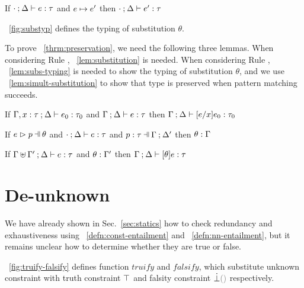 \documentclass[runningheads,envcountsame,a4paper]{llncs}
\begin{document}
\begin{theorem}[Preservation]
  \label{thrm:preservation}
  If $\cdot \mathbin{;} \Delta \vdash e : \tau$ and $e \mapsto e'$
  then $\cdot \mathbin{;} \Delta \vdash e' : \tau$
\end{theorem}



\figurename~\ref{fig:substyp} defines the typing of substitution $\theta$.

To prove \theoremname~\ref{thrm:preservation}, we need the following three lemmas.
When considering Rule \ITAp, \lemmaname~\ref{lem:substitution} is needed.
When considering Rule \ITSuccMatch, \lemmaname~\ref{lem:subs-typing} is needed
to show the typing of substitution $\theta$, and we use
\lemmaname~\ref{lem:simult-substitution} to show that type is preserved when pattern
matching succeeds.

\begin{lemma}[Substitution]
  \label{lem:substitution}
  If $\Gamma, x : \tau \mathbin{;} \Delta \vdash e_0 : \tau_0$ and $\Gamma \mathbin{;} \Delta \vdash e : \tau$
  then $\Gamma \mathbin{;} \Delta \vdash [e/x]e_0 : \tau_0$
\end{lemma}

\begin{lemma}
  \label{lem:subs-typing}
  If $\hpatmatch{e}{p}{\theta}$ and $\cdot \mathbin{;} \Delta \vdash e : \tau$ and $\hpattyp{p}{\tau}{\Gamma}{\Delta'}$
  then $\theta : \Gamma$
\end{lemma}

\begin{lemma}
  \label{lem:simult-substitution}
  If $\Gamma \uplus \Gamma' \mathbin{;} \Delta \vdash e : \tau$ and $\theta : \Gamma'$
  then $\Gamma \mathbin{;} \Delta \vdash [\theta]e : \tau$
\end{lemma}

\section{De-unknown}\label{sec:algorithm}

We have already shown in Sec.~\ref{sec:statics} how to check redundancy and
exhaustiveness using ~\ref{defn:const-entailment} and
~\ref{defn:nn-entailment}, but it remains unclear how to
determine whether they are true or false.



\figurename~\ref{fig:truify-falsify} defines function $truify$ and $falsify$,
which substitute unknown constraint with truth constraint $\top$ and falsity
constraint $\cfalsify$ respectively.
\end{document}
